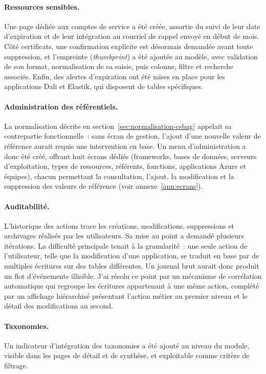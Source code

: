 \paragraph{Ressources sensibles.}
Une page dédiée aux comptes de service a été créée, assortie du suivi de leur
date d'expiration et de leur intégration au courriel de rappel envoyé en début
de mois. Côté certificats, une confirmation explicite est désormais demandée
avant toute suppression, et l'empreinte (\textit{thumbprint}) a été
ajoutée au modèle, avec validation de son format, normalisation de sa saisie,
puis colonne, filtre et recherche associés. Enfin, des alertes d'expiration ont
été mises en place pour les applications Dali et Elastik, qui disposent de
tables spécifiques.

\paragraph{Administration des référentiels.}
La normalisation décrite en section~\ref{sec:normalisation-csbag} appelait sa
contrepartie fonctionnelle~: sans écran de gestion, l'ajout d'une nouvelle
valeur de référence aurait requis une intervention en base. Un menu
d'administration a donc été créé, offrant huit écrans dédiés (frameworks, bases
de données, serveurs d'exploitation, types de ressources, référents, fonctions,
applications Azure et équipes), chacun permettant la consultation, l'ajout, la
modification et la suppression des valeurs de référence
(voir annexe~\ref{ann:ecrans}).

\paragraph{Auditabilité.}
L'historique des actions trace les créations, modifications, suppressions et
archivages réalisés par les utilisateurs. Sa mise au point a demandé plusieurs
itérations. La difficulté principale tenait à la granularité~: une seule action
de l'utilisateur, telle que la modification d'une application, se traduit en
base par de multiples écritures sur des tables différentes. Un journal brut
aurait donc produit un flot d'événements illisible. J'ai résolu ce point par un
mécanisme de corrélation automatique qui regroupe les écritures
appartenant à une même action, complété par un affichage hiérarchisé présentant
l'action métier au premier niveau et le détail des modifications au second.

\paragraph{Taxonomies.}
Un indicateur d'intégration des taxonomies a été ajouté au niveau du module,
visible dans les pages de détail et de synthèse, et exploitable comme critère de
filtrage.

